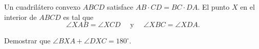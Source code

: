 Un cuadrilátero convexo $ABCD$ satisface $AB \cdot CD = BC \cdot DA$. El punto $X$ en el
interior de $ABCD$ es tal que
\[\angle{XAB} = \angle{XCD}\quad\,\,\text{y}\quad\,\,\angle{XBC} = \angle{XDA}.\]

Demostrar que $\angle BXA + \angle DXC = 180^{\circ}$.